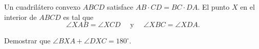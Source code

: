 Un cuadrilátero convexo $ABCD$ satisface $AB \cdot CD = BC \cdot DA$. El punto $X$ en el
interior de $ABCD$ es tal que
\[\angle{XAB} = \angle{XCD}\quad\,\,\text{y}\quad\,\,\angle{XBC} = \angle{XDA}.\]

Demostrar que $\angle BXA + \angle DXC = 180^{\circ}$.